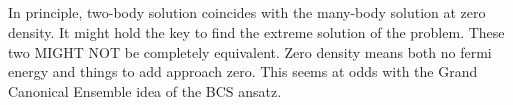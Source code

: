 \subsection{}
In principle, two-body solution coincides with the many-body solution at zero density.  It might hold the key to find the extreme solution of the problem.  These two MIGHT NOT be completely equivalent.  Zero density means both no fermi energy and things to add approach zero.   This seems at odds with the Grand Canonical Ensemble idea of the BCS ansatz.   